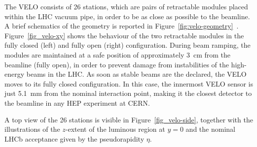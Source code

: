 The VELO consists of 26 stations, which are pairs of retractable modules placed within the LHC vacuum pipe, in order to be as close as possible to the beamline. 
A brief schematics of the geometry is reported in Figure~\ref{fig:velo-geometry}~\cite{LHCbVelo:2019flq}. Figure~\ref{fig_velo-xy} shows the behaviour of the two retractable modules in the fully closed (left) and fully open (right) configuration. During beam ramping, the modules are maintained at a safe position of approximately \SI{3}{\centi\meter} from the beamline (fully open), in order to prevent damage from instabilities of the high-energy beams in the LHC. As soon as stable beams are the declared, the VELO moves to its fully closed configuration. In this case, the innermost VELO sensor is just \SI{5.1}{\milli\meter} from the nominal interaction point, making it the closest detector to the beamline in any HEP experiment at CERN. 

A top view of the 26 stations is visible in Figure~\ref{fig_velo-side}, together with the illustrations of the $z$-extent of the luminous region at $y=0$ and the nominal LHCb acceptance given by the pseudorapidity $\eta$. 

